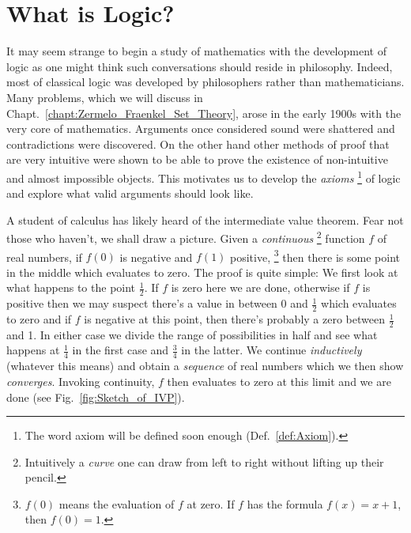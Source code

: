 \section{What is Logic?}
    It may seem strange to begin a study of mathematics with the development of
    logic as one might think such conversations should reside in philosophy.
    Indeed, most of classical logic was developed by philosophers rather than
    mathematicians. Many problems, which we will discuss in
    Chapt.~\ref{chapt:Zermelo_Fraenkel_Set_Theory}, arose in the early 1900s
    with the very core of mathematics. Arguments once considered sound were
    shattered and contradictions were discovered. On the other hand
    other methods of proof that are very intuitive were shown to be able to
    prove the existence of non-intuitive and almost impossible objects. This
    motivates us to develop the \textit{axioms}%
    \footnote{%
        The word axiom will be defined soon enough (Def.~\ref{def:Axiom}).
    }
    of logic and explore what valid arguments should look like.
    \begin{example}
        \label{ex:Logic_IVP}%
        A student of calculus has likely heard of the intermediate value
        theorem. Fear not those who haven't,
        we shall draw a picture. Given a \textit{continuous}%
        \footnote{%
            Intuitively a \textit{curve} one can draw from left to right without
            lifting up their pencil.%
        }
        function $f$ of real numbers, if $f(0)$ is negative and $f(1)$
        positive,%
        \footnote{%
            $f(0)$ means the evaluation of $f$ at zero. If $f$ has the formula
            $f(x)=x+1$, then $f(0)=1$.
        }
        then there is some point in the middle which evaluates to zero. The
        proof is quite simple: We first look at what happens to the point
        $\frac{1}{2}$. If $f$ is zero here we are done, otherwise if $f$ is
        positive then we may suspect there's a value in
        between 0 and $\frac{1}{2}$ which evaluates to zero and if $f$ is
        negative at this point, then there's probably a zero between
        $\frac{1}{2}$ and 1. In either case we divide the range of possibilities
        in half and see what happens at $\frac{1}{4}$ in the first case and
        $\frac{3}{4}$ in the latter. We continue \textit{inductively} (whatever
        this means) and obtain a \textit{sequence} of real numbers which we then
        show \textit{converges}. Invoking continuity, $f$ then evaluates to
        zero at this limit and we are done (see Fig.~\ref{fig:Sketch_of_IVP}).
    \end{example}
